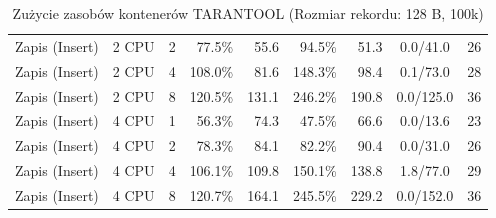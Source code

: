 \begin{table}[ht]
{\begin{tabular}{llcrrrrcc}
Zapis (Insert) & 2 CPU & 2 & 77.5\% & 55.6 & 94.5\% & 51.3 & 0.0/41.0 & 26 \\
Zapis (Insert) & 2 CPU & 4 & 108.0\% & 81.6 & 148.3\% & 98.4 & 0.1/73.0 & 28 \\
Zapis (Insert) & 2 CPU & 8 & 120.5\% & 131.1 & 246.2\% & 190.8 & 0.0/125.0 & 36 \\
Zapis (Insert) & 4 CPU & 1 & 56.3\% & 74.3 & 47.5\% & 66.6 & 0.0/13.6 & 23 \\
Zapis (Insert) & 4 CPU & 2 & 78.3\% & 84.1 & 82.2\% & 90.4 & 0.0/31.0 & 26 \\
Zapis (Insert) & 4 CPU & 4 & 106.1\% & 109.8 & 150.1\% & 138.8 & 1.8/77.0 & 29 \\
Zapis (Insert) & 4 CPU & 8 & 120.7\% & 164.1 & 245.5\% & 229.2 & 0.0/152.0 & 36 \\
\bottomrule
\end{tabular}%
}
\caption{Zużycie zasobów kontenerów TARANTOOL (Rozmiar rekordu: 128 B, 100k)}
\label{tab:resources_tarantool_small_100000}
\end{table}
